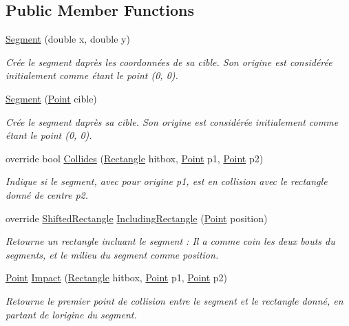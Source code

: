 \subsection*{Public Member Functions}
\begin{DoxyCompactItemize}
\item 
\hyperlink{class_tentacle_slicers_1_1collisions_1_1_segment_ade4ddd9352ef4b56cee6ac58d639eae2}{Segment} (double x, double y)
\begin{DoxyCompactList}\small\item\em Crée le segment d\textquotesingle{}après les coordonnées de sa cible. Son origine est considérée initialement comme étant le point (0, 0). \end{DoxyCompactList}\item 
\hyperlink{class_tentacle_slicers_1_1collisions_1_1_segment_a24beaff9e89a6b3fd54b59f16a9edb4b}{Segment} (\hyperlink{class_tentacle_slicers_1_1general_1_1_point}{Point} cible)
\begin{DoxyCompactList}\small\item\em Crée le segment d\textquotesingle{}après sa cible. Son origine est considérée initialement comme étant le point (0, 0). \end{DoxyCompactList}\item 
override bool \hyperlink{class_tentacle_slicers_1_1collisions_1_1_segment_a6af6eae47bbfa2f74e0e714e034d5af8}{Collides} (\hyperlink{class_tentacle_slicers_1_1collisions_1_1_rectangle}{Rectangle} hitbox, \hyperlink{class_tentacle_slicers_1_1general_1_1_point}{Point} p1, \hyperlink{class_tentacle_slicers_1_1general_1_1_point}{Point} p2)
\begin{DoxyCompactList}\small\item\em Indique si le segment, avec pour origine p1, est en collision avec le rectangle donné de centre p2. \end{DoxyCompactList}\item 
override \hyperlink{struct_tentacle_slicers_1_1collisions_1_1_shifted_rectangle}{Shifted\+Rectangle} \hyperlink{class_tentacle_slicers_1_1collisions_1_1_segment_a9d4a74136b93980586e412d8bb295ec9}{Including\+Rectangle} (\hyperlink{class_tentacle_slicers_1_1general_1_1_point}{Point} position)
\begin{DoxyCompactList}\small\item\em Retourne un rectangle incluant le segment \+: Il a comme coin les deux bouts du segments, et le milieu du segment comme position. \end{DoxyCompactList}\item 
\hyperlink{class_tentacle_slicers_1_1general_1_1_point}{Point} \hyperlink{class_tentacle_slicers_1_1collisions_1_1_segment_a060d2e1954b3b6eee9225cb52bddc8c5}{Impact} (\hyperlink{class_tentacle_slicers_1_1collisions_1_1_rectangle}{Rectangle} hitbox, \hyperlink{class_tentacle_slicers_1_1general_1_1_point}{Point} p1, \hyperlink{class_tentacle_slicers_1_1general_1_1_point}{Point} p2)
\begin{DoxyCompactList}\small\item\em Retourne le premier point de collision entre le segment et le rectangle donné, en partant de l\textquotesingle{}origine du segment. \end{DoxyCompactList}\end{DoxyCompactItemize}

